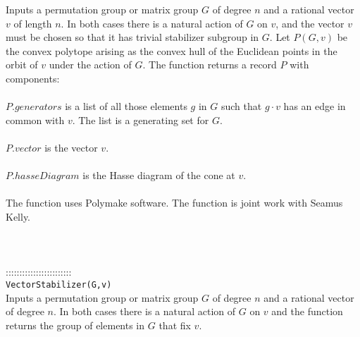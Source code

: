 \documentclass[a4paper,11pt]{report}
\begin{document}
{ Inputs a permutation group or matrix group $G$ of degree $n$ and a rational vector $v$ of length $n$. In both cases there is a natural action of $G$ on $v$, and the vector $v$ must be chosen so that it has trivial stabilizer subgroup in $G$. Let $P(G,v)$ be the convex polytope arising as the convex hull of the Euclidean points in
the orbit of $v$ under the action of $G$. The function returns a record $P$ with components: \\
 \\
 $P.generators$ is a list of all those elements $g$ in $G$ such that $g\cdot v$ has an edge in common with $v$. The list is a generating set for $G$.\\
 \\
 $P.vector$ is the vector $v$.\\
 \\
$P.hasseDiagram$ is the Hasse diagram of the cone at $v$. \\
 \\
 The function uses Polymake software. The function is joint work with Seamus
Kelly. \\
 \\
 \\
 \\
 ::::::::::::::::::::::::\\
 \texttt{VectorStabilizer(G,v) }\\
 

 Inputs a permutation group or matrix group $G$ of degree $n$ and a rational vector of degree $n$. In both cases there is a natural action of $G$ on $v$ and the function returns the group of elements in $G$ that fix $v$. \\
 \\
 \\
 }

 
\end{document}
